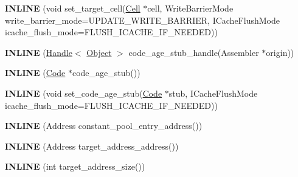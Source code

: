 \begin{DoxyCompactItemize}
\item 
\hypertarget{classv8_1_1internal_1_1_reloc_info_a2de019805d0bb49cad94d0ead995a01d}{}{\bfseries I\+N\+L\+I\+N\+E} (void set\+\_\+target\+\_\+cell(\hyperlink{classv8_1_1internal_1_1_cell}{Cell} $\ast$cell, Write\+Barrier\+Mode write\+\_\+barrier\+\_\+mode=U\+P\+D\+A\+T\+E\+\_\+\+W\+R\+I\+T\+E\+\_\+\+B\+A\+R\+R\+I\+E\+R, I\+Cache\+Flush\+Mode icache\+\_\+flush\+\_\+mode=F\+L\+U\+S\+H\+\_\+\+I\+C\+A\+C\+H\+E\+\_\+\+I\+F\+\_\+\+N\+E\+E\+D\+E\+D))\label{classv8_1_1internal_1_1_reloc_info_a2de019805d0bb49cad94d0ead995a01d}

\item 
\hypertarget{classv8_1_1internal_1_1_reloc_info_a8d7e195c31afc9400cec9025bee47355}{}{\bfseries I\+N\+L\+I\+N\+E} (\hyperlink{classv8_1_1internal_1_1_handle}{Handle}$<$ \hyperlink{classv8_1_1internal_1_1_object}{Object} $>$ code\+\_\+age\+\_\+stub\+\_\+handle(Assembler $\ast$origin))\label{classv8_1_1internal_1_1_reloc_info_a8d7e195c31afc9400cec9025bee47355}

\item 
\hypertarget{classv8_1_1internal_1_1_reloc_info_a3d0f27312c882a24cc408009fb809608}{}{\bfseries I\+N\+L\+I\+N\+E} (\hyperlink{classv8_1_1internal_1_1_code}{Code} $\ast$code\+\_\+age\+\_\+stub())\label{classv8_1_1internal_1_1_reloc_info_a3d0f27312c882a24cc408009fb809608}

\item 
\hypertarget{classv8_1_1internal_1_1_reloc_info_a7371b688fc32e9befb897b1ffdc50b18}{}{\bfseries I\+N\+L\+I\+N\+E} (void set\+\_\+code\+\_\+age\+\_\+stub(\hyperlink{classv8_1_1internal_1_1_code}{Code} $\ast$stub, I\+Cache\+Flush\+Mode icache\+\_\+flush\+\_\+mode=F\+L\+U\+S\+H\+\_\+\+I\+C\+A\+C\+H\+E\+\_\+\+I\+F\+\_\+\+N\+E\+E\+D\+E\+D))\label{classv8_1_1internal_1_1_reloc_info_a7371b688fc32e9befb897b1ffdc50b18}

\item 
\hypertarget{classv8_1_1internal_1_1_reloc_info_a4079d9f09809a5edb5859f9ceb34f23e}{}{\bfseries I\+N\+L\+I\+N\+E} (Address constant\+\_\+pool\+\_\+entry\+\_\+address())\label{classv8_1_1internal_1_1_reloc_info_a4079d9f09809a5edb5859f9ceb34f23e}

\item 
\hypertarget{classv8_1_1internal_1_1_reloc_info_a2572ce3ce1269f8998e4742a3d7c647a}{}{\bfseries I\+N\+L\+I\+N\+E} (Address target\+\_\+address\+\_\+address())\label{classv8_1_1internal_1_1_reloc_info_a2572ce3ce1269f8998e4742a3d7c647a}

\item 
\hypertarget{classv8_1_1internal_1_1_reloc_info_a8c54c1ada127ad24fd8723339b9b638b}{}{\bfseries I\+N\+L\+I\+N\+E} (int target\+\_\+address\+\_\+size())\label{classv8_1_1internal_1_1_reloc_info_a8c54c1ada127ad24fd8723339b9b638b}


\end{DoxyCompactItemize}
